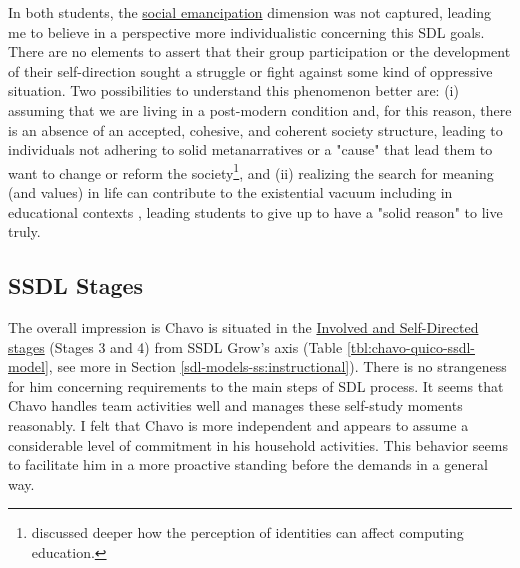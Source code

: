 In both students, the \underline{social emancipation} dimension was not captured, leading me to believe in a perspective more individualistic concerning this \gls{SDL} goals. There are no elements to assert that their group participation or the development of their self-direction sought a struggle or fight against some kind of oppressive situation. Two possibilities to understand this phenomenon better are: (i) assuming that we are living in a post-modern condition and, for this reason, there is an absence of an accepted, cohesive, and coherent society structure, leading to individuals not adhering to solid metanarratives or a "cause" that lead them to want to change or reform the society\footnote{ discussed deeper how the perception of identities can affect computing education.}, and (ii) realizing the search for meaning (and values) in life can contribute to the existential vacuum including in educational contexts \cite{csanli:2021}, leading students to give up to have a "solid reason" to live truly.

\subsection{SSDL Stages}
\label{disc-ss:staged-sdl}

The overall impression is Chavo is situated in the \underline{Involved and Self-Directed stages} (Stages 3 and 4) from \gls{SSDL} Grow's axis (Table \ref{tbl:chavo-quico-ssdl-model}, see more in Section \ref{sdl-models-ss:instructional}). There is no strangeness for him concerning requirements to the main steps of \gls{SDL} process. It seems that Chavo handles team activities well and manages these self-study moments reasonably. I felt that Chavo is more independent and appears to assume a considerable level of commitment in his household activities. This behavior seems to facilitate him in a more proactive standing before the demands in a general way. 

\renewcommand\fbox{\fcolorbox{white}{gray!30}}

